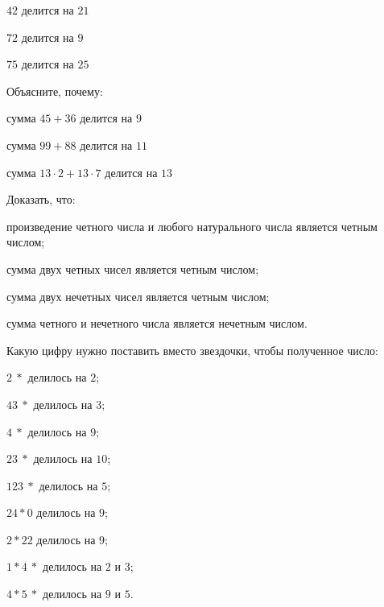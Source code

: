 \begin{listofex}
\begin{enumcols}[itemcolumns=3]
		\item \( 42 \) делится на \( 21 \)
		\item \( 72 \) делится на \( 9 \)
		\item \( 75 \) делится на \( 25 \)
	\end{enumcols}
	\item Объясните, почему:
	\begin{enumcols}[itemcolumns=2]
		\item сумма \( 45+36 \) делится на \( 9 \)
		\item сумма \( 99+88 \) делится на \( 11 \)
		\item сумма \( 13\cdot2+13\cdot7\) делится на \( 13 \)
	\end{enumcols}
	\item Доказать, что:
	\begin{enumcols}[itemcolumns=1]
		\item произведение четного числа и любого натурального числа является четным числом;
		\item сумма двух четных чисел является четным числом;
		\item сумма двух нечетных чисел является четным числом;
		\item сумма четного и нечетного числа является нечетным числом.
	\end{enumcols}
	\item Какую цифру нужно поставить вместо звездочки, чтобы полученное число:
	\begin{enumcols}[itemcolumns=3]
		\item \( 2\:* \) делилось на \( 2 \);
		\item \( 43\:* \) делилось на \( 3 \);
		\item \( 4\:* \) делилось на \( 9 \);
		\item \( 23\:* \) делилось на \( 10 \);
		\item \( 123\:* \) делилось на \( 5 \);
		\item \( 24*0 \) делилось на \( 9 \);
		\item \( 2*22 \) делилось на \( 9 \);
		\item \( 1*4\:* \) делилось на \( 2 \) и \( 3 \);
		\item \( 4*5\:* \) делилось на \( 9 \) и \( 5 \).
	\end{enumcols}
\end{listofex}
